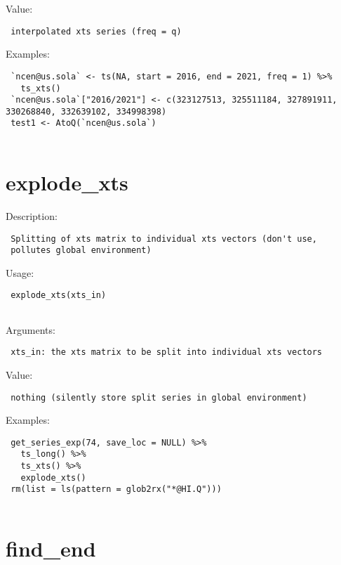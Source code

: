 \documentclass[
  letterpaper,
  DIV=11,
  numbers=noendperiod]{scrreport}
\begin{document}
Value:

\begin{verbatim}
 interpolated xts series (freq = q)
\end{verbatim}

Examples:

\begin{verbatim}
 `ncen@us.sola` <- ts(NA, start = 2016, end = 2021, freq = 1) %>% 
   ts_xts()
 `ncen@us.sola`["2016/2021"] <- c(323127513, 325511184, 327891911, 330268840, 332639102, 334998398)
 test1 <- AtoQ(`ncen@us.sola`)
 
\end{verbatim}

\section{explode\_xts}\label{explode_xts}

Description:

\begin{verbatim}
 Splitting of xts matrix to individual xts vectors (don't use,
 pollutes global environment)
\end{verbatim}

Usage:

\begin{verbatim}
 explode_xts(xts_in)
 
\end{verbatim}

Arguments:

\begin{verbatim}
 xts_in: the xts matrix to be split into individual xts vectors
\end{verbatim}

Value:

\begin{verbatim}
 nothing (silently store split series in global environment)
\end{verbatim}

Examples:

\begin{verbatim}
 get_series_exp(74, save_loc = NULL) %>%
   ts_long() %>%
   ts_xts() %>%
   explode_xts()
 rm(list = ls(pattern = glob2rx("*@HI.Q")))
 
\end{verbatim}

\section{find\_end}\label{find_end}
\end{document}
